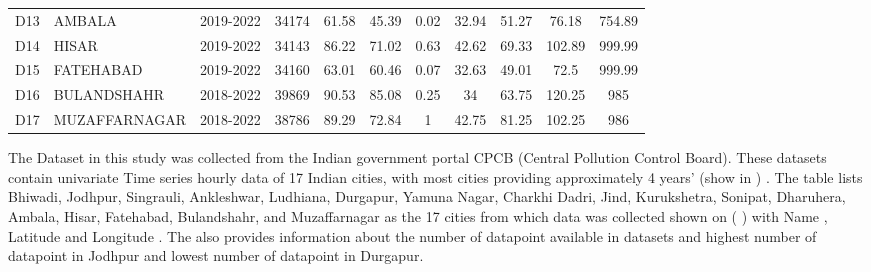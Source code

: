 \documentclass[a4paper, fleqn]{cas-sc}
\theoremstyle{definition}
\theoremstyle{remark}
\begin{document}
\begin{table}[h!]
\begin{tabular}{llccccccccc}
 D13 &  AMBALA         & 2019-2022 & 34174 & 61.58 & 45.39 & 0.02 & 32.94   & 51.27       & 76.18 & 754.89 \\
 D14 &  HISAR          & 2019-2022 & 34143 & 86.22 & 71.02 & 0.63 & 42.62   & 69.33       & 102.89 & 999.99 \\ 
 D15 &  FATEHABAD      & 2019-2022 & 34160 & 63.01 & 60.46 & 0.07 & 32.63   & 49.01       & 72.5    & 999.99 \\
 D16 &  BULANDSHAHR  & 2018-2022 & 39869  & 90.53 & 85.08 & 0.25 & 34      & 63.75       & 120.25  & 985    \\ 
 D17 &  MUZAFFARNAGAR  & 2018-2022 & 38786 & 89.29 & 72.84  & 1    & 42.75   & 81.25       & 102.25  & 986    \\ \hline
  \end{tabular}
  \end{table}
  
The Dataset in this study was collected from the Indian government portal CPCB (Central Pollution Control Board). These datasets contain univariate Time series hourly data of 17 Indian cities,  with most cities providing approximately 4 years' (show in ) . The table lists Bhiwadi,  Jodhpur,  Singrauli,  Ankleshwar,  Ludhiana,  Durgapur,  Yamuna Nagar,  Charkhi Dadri,  Jind,  Kurukshetra,  Sonipat,  Dharuhera,  Ambala,  Hisar,  Fatehabad,  Bulandshahr,  and Muzaffarnagar as the 17 cities from which data was collected shown on ( ) with Name ,  Latitude and Longitude . The  also provides information about the number of datapoint available in datasets and  highest number of datapoint in Jodhpur and lowest number of datapoint in Durgapur.
\end{document}
